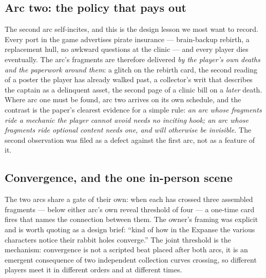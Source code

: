 \documentclass[10pt,twocolumn]{article}
\begin{document}
\subsection{Arc two: the policy that pays out}

The second arc self-incites, and this is the design lesson we most want to record. Every port
in the game advertises pirate insurance --- brain-backup rebirth, a replacement hull, no
awkward questions at the clinic --- and every player dies eventually. The arc's fragments are
therefore delivered \emph{by the player's own deaths and the paperwork around them}: a glitch
on the rebirth card, the second reading of a poster the player has already walked past, a
collector's writ that describes the captain as a delinquent asset, the second page of a
clinic bill on a \emph{later} death. Where arc one must be found, arc two arrives on its own
schedule, and the contrast is the paper's clearest evidence for a simple rule: \emph{an arc
whose fragments ride a mechanic the player cannot avoid needs no inciting hook; an arc whose
fragments ride optional content needs one, and will otherwise be invisible.} The second
observation was filed as a defect against the first arc, not as a feature of it.

\subsection{Convergence, and the one in-person scene}

The two arcs share a gate of their own: when each has crossed three assembled fragments ---
below either arc's own reveal threshold of four --- a one-time card fires that names the
connection between them. The owner's framing was explicit and is worth quoting as a design
brief: ``kind of how in the Expanse the various characters notice their rabbit holes
converge.'' The joint threshold is the mechanism: convergence is not a scripted beat placed
after both arcs, it is an emergent consequence of two independent collection curves crossing,
so different players meet it in different orders and at different times.
\end{document}
